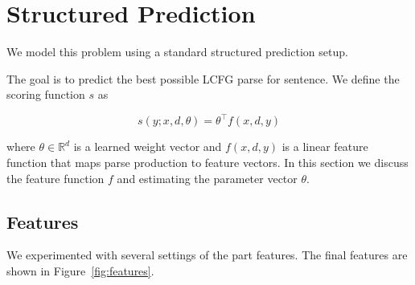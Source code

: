 \documentclass[11pt,letterpaper]{article}
\DeclareMathOperator*{\argmax}{arg\,max}
\newcommand{\Reals}{\mathbb{R}}
\begin{document}





\section{Structured Prediction}

We model this problem using a standard structured prediction setup.

The goal is to predict the best possible LCFG parse for sentence.
We define the scoring function $s$ as

\[s(y;x, d, \theta) =  \theta^{\top} f(x, d, y) \]

\noindex
where $\theta \in \Reals^d $ is a learned weight vector and $f(x, d, y)$ is a linear feature function
that maps parse production to feature vectors. In this section we discuss the feature function $f$ and estimating the parameter vector $\theta$.

\subsection{Features}








We experimented with several settings of the part features.
The final features are shown in  Figure~\ref{fig:features}.
\end{document}
